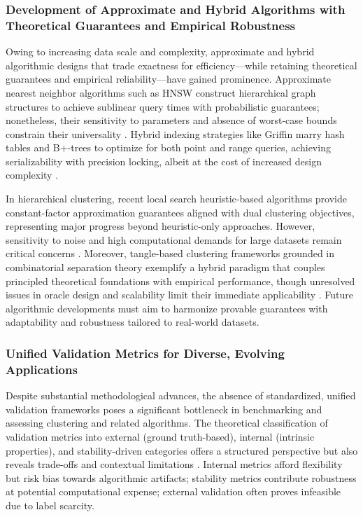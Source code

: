 \documentclass[sigconf]{acmart}
\begin{document}
\subsubsection{Development of Approximate and Hybrid Algorithms with Theoretical Guarantees and Empirical Robustness}

Owing to increasing data scale and complexity, approximate and hybrid algorithmic designs that trade exactness for efficiency—while retaining theoretical guarantees and empirical reliability—have gained prominence. Approximate nearest neighbor algorithms such as HNSW construct hierarchical graph structures to achieve sublinear query times with probabilistic guarantees; nonetheless, their sensitivity to parameters and absence of worst-case bounds constrain their universality \cite{ref4}. Hybrid indexing strategies like Griffin marry hash tables and B+-trees to optimize for both point and range queries, achieving serializability with precision locking, albeit at the cost of increased design complexity \cite{ref35}.

In hierarchical clustering, recent local search heuristic-based algorithms provide constant-factor approximation guarantees aligned with dual clustering objectives, representing major progress beyond heuristic-only approaches. However, sensitivity to noise and high computational demands for large datasets remain critical concerns \cite{ref20}. Moreover, tangle-based clustering frameworks grounded in combinatorial separation theory exemplify a hybrid paradigm that couples principled theoretical foundations with empirical performance, though unresolved issues in oracle design and scalability limit their immediate applicability \cite{ref21}. Future algorithmic developments must aim to harmonize provable guarantees with adaptability and robustness tailored to real-world datasets.

\subsubsection{Unified Validation Metrics for Diverse, Evolving Applications}

Despite substantial methodological advances, the absence of standardized, unified validation frameworks poses a significant bottleneck in benchmarking and assessing clustering and related algorithms. The theoretical classification of validation metrics into external (ground truth-based), internal (intrinsic properties), and stability-driven categories offers a structured perspective but also reveals trade-offs and contextual limitations \cite{ref24}. Internal metrics afford flexibility but risk bias towards algorithmic artifacts; stability metrics contribute robustness at potential computational expense; external validation often proves infeasible due to label scarcity.
\end{document}
